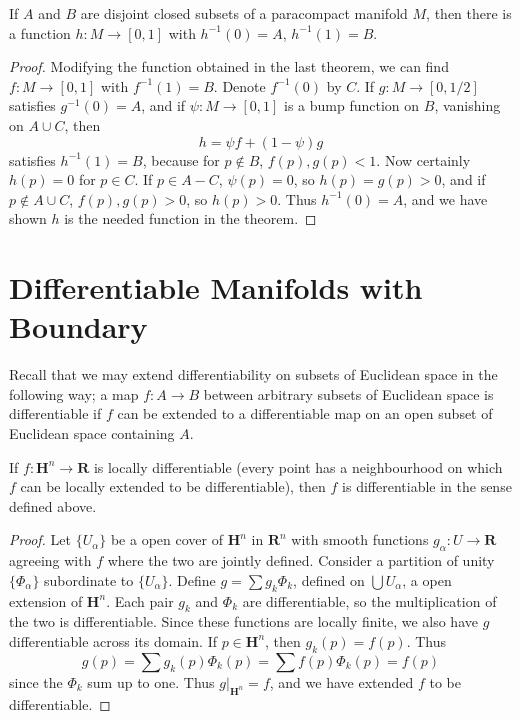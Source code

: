 \begin{corollary}
    If $A$ and $B$ are disjoint closed subsets of a paracompact manifold $M$, then there is a function $h: M \to [0,1]$ with $h^{-1}(0) = A$, $h^{-1}(1) = B$.
\end{corollary}
\begin{proof}
    Modifying the function obtained in the last theorem, we can find $f: M \to [0,1]$ with $f^{-1}(1) = B$. Denote $f^{-1}(0)$ by $C$. If $g: M \to [0,1/2]$ satisfies $g^{-1}(0) = A$, and if $\psi: M \to [0,1]$ is a bump function on $B$, vanishing on $A \cup C$, then
    \[ h = \psi f + (1 - \psi) g \]
    satisfies $h^{-1}(1) = B$, because for $p \not \in B$, $f(p), g(p) < 1$. Now certainly $h(p) = 0$ for $p \in C$. If $p \in A - C$, $\psi(p) = 0$, so $h(p) = g(p) > 0$, and if $p \not \in A \cup C$, $f(p), g(p) > 0$, so $h(p) > 0$. Thus $h^{-1}(0) = A$, and we have shown $h$ is the needed function in the theorem.
\end{proof}

\section{Differentiable Manifolds with Boundary}

Recall that we may extend differentiability on subsets of Euclidean space in the following way; a map $f: A \to B$ between arbitrary subsets of Euclidean space is differentiable if $f$ can be extended to a differentiable map on an open subset of Euclidean space containing $A$.

\begin{theorem}
    If $f:\mathbf{H}^n \to \mathbf{R}$ is locally differentiable (every point has a neighbourhood on which $f$ can be locally extended to be differentiable), then $f$ is differentiable in the sense defined above.
\end{theorem}
\begin{proof}
    Let $\{ U_\alpha \}$ be a open cover of $\mathbf{H}^n$ in $\mathbf{R}^n$ with smooth functions $g_\alpha:U \to \mathbf{R}$ agreeing with $f$ where the two are jointly defined. Consider a partition of unity $\{ \Phi_\alpha \}$ subordinate to $\{ U_\alpha \}$. Define $g = \sum g_k \Phi_k$, defined on $\bigcup U_\alpha$, a open extension of $\mathbf{H}^n$. Each pair $g_k$ and $\Phi_k$ are differentiable, so the multiplication of the two is differentiable. Since these functions are locally finite, we also have $g$ differentiable across its domain. If $p \in \mathbf{H}^n$, then $g_k(p) = f(p)$. Thus
    \[ g(p) = \sum g_k(p) \Phi_k(p) = \sum f(p) \Phi_k(p) = f(p) \]
    since the $\Phi_k$ sum up to one. Thus $g|_{\mathbf{H}^n} = f$, and we have extended $f$ to be differentiable.
\end{proof}

